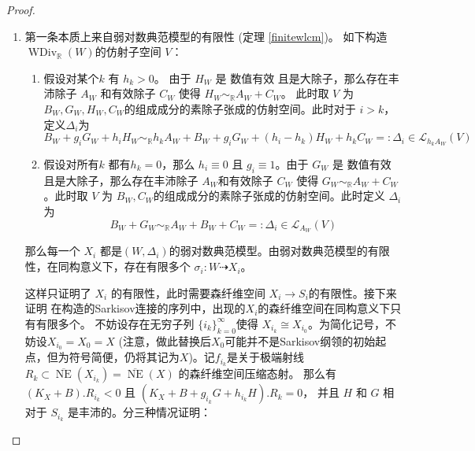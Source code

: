\begin{proof}
  \begin{enumerate}
    \item 第一条本质上来自弱对数典范模型的有限性 (定理 \ref{finitewlcm})。  如下构造 $\operatorname{WDiv}_{\mathbb{R}}(W)$的仿射子空间 $V$：
      \begin{enumerate}
        \item 假设对某个$k$ 有  $h_{k}>0$。 由于 $H_{W}$ 是 数值有效 且是大除子，那么存在丰沛除子 $A_{W}$ 和有效除子 $C_{W}$  使得 $H_{W}\sim_{\mathbb{R}}A_{W}+C_{W}$。 此时取 $V$ 为  $B_{W},G_{W},H_{W},C_{W}$的组成成分的素除子张成的仿射空间。此时对于 $i>k$，定义$\Delta_{i}$为
              \[ B_{W}+g_{i}G_{W}+h_{i}H_{W}\sim_{\mathbb{R}} h_{k}A_{W}+B_{W}+g_{i}G_{W}+(h_{i}-h_{k})H_{W}+h_{k}C_{W}=:\Delta_{i} \in \mathcal{L}_{h_{k}A_{W}}(V) \]
        \item 假设对所有$k$ 都有$h_{k}=0$，那么  $h_{i}\equiv 0$ 且 $g_{i}\equiv 1$。由于  $G_{W}$ 是 数值有效 且是大除子，那么存在丰沛除子 $A_{W}$和有效除子 $C_{W}$ 使得 $G_{W}\sim_{\mathbb{R}}A_{W}+C_{W}$。此时取 $V$ 为  $B_{W},C_{W}$的组成成分的素除子张成的仿射空间。此时定义 $\Delta_{i}$为
              \[ B_{W}+G_{W}\sim_{\mathbb{R}} A_{W}+B_{W}+C_{W}=:\Delta_{i} \in \mathcal{L}_{A_{W}}(V) \]
      \end{enumerate}
          那么每一个 $X_{i}$ 都是$(W,\Delta_{i})$的弱对数典范模型。由弱对数典范模型的有限性，在同构意义下，存在有限多个 $\sigma_{i}: W\dashrightarrow X_{i}$。

          这样只证明了 $X_{i}$ 的有限性，此时需要森纤维空间 $X_{i}\to S_{i}$的有限性。接下来证明 在构造的Sarkisov连接的序列中，出现的$X_{i}$的森纤维空间在同构意义下只有有限多个。
          不妨设存在无穷子列 $\{i_{k}\}_{k=0}^{\infty} $使得 $X_{i_{k}}\cong X_{i_{0}}$。为简化记号，不妨设$X_{i_{0}}=X_{0}=X$ (注意，做此替换后$X_{0}$可能并不是Sarkisov纲领的初始起点，但为符号简便，仍将其记为$X$)。记$f_{i_{k}}$是关于极端射线 $R_{k} \subset \overline{\operatorname{NE}}(X_{i_{k}})= \overline{\operatorname{NE}}(X) $ 的森纤维空间压缩态射。 那么有
          $(K_{X}+B).R_{i_{k}}<0  $ 且 $(K_{X}+B+g_{i_{k}}G+h_{i_{k}}H).R_{k}=0$， 并且 $H$ 和 $G$ 相对于 $S_{i_{k}}$ 是丰沛的。分三种情况证明：
      \begin{enumerate}


\end{enumerate}
\end{enumerate}
\end{proof}
